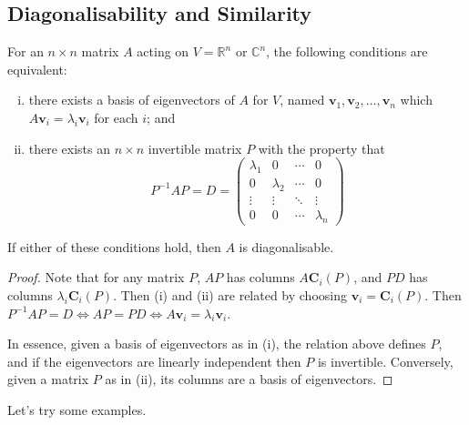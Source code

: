 \documentclass{article}
\begin{document}
	\subsection{Diagonalisability and Similarity}
	\begin{proposition}
		For an $n \times n$ matrix $A$ acting on $V = \mathbb R^n$ or $\mathbb C^n$, the following conditions are equivalent:
		\begin{enumerate}[(i)]
			\item there exists a basis of eigenvectors of $A$ for $V$, named $\bm v_1, \bm v_2, \dots, \bm v_n$ which $A\bm v_i = \lambda_i\bm v_i$ for each $i$; and
			\item there exists an $n \times n$ invertible matrix $P$ with the property that
			\[ P^{-1}AP = D = \begin{pmatrix}
				\lambda_1 & 0 & \cdots & 0 \\
				0 & \lambda_2 & \cdots & 0 \\
				\vdots & \vdots & \ddots & \vdots \\
				0 & 0 & \cdots & \lambda_n
			\end{pmatrix} \]
		\end{enumerate}
		If either of these conditions hold, then $A$ is diagonalisable.
	\end{proposition}
	\begin{proof}
		Note that for any matrix $P$, $AP$ has columns $A\bm C_i(P)$, and $PD$ has columns $\lambda_i \bm C_i(P)$. Then (i) and (ii) are related by choosing $\bm v_i = \bm C_i(P)$. Then $P^{-1}AP = D \iff AP = PD \iff A\bm v_i = \lambda_i\bm v_i$.

		In essence, given a basis of eigenvectors as in (i), the relation above defines $P$, and if the eigenvectors are linearly independent then $P$ is invertible. Conversely, given a matrix $P$ as in (ii), its columns are a basis of eigenvectors.
	\end{proof}
	Let's try some examples.
\end{document}
